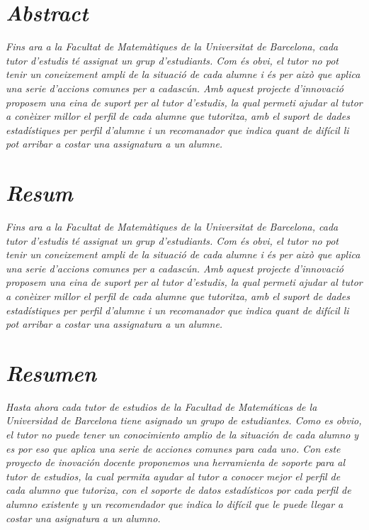 \documentclass[12pt,a4paper,catalan]{article}
\begin{document}



\section*{\textit{Abstract}}
\textit{Fins ara a la Facultat de Matemàtiques de la Universitat de Barcelona, cada tutor d'estudis té assignat un grup d'estudiants. Com és obvi, el tutor no pot tenir un coneixement ampli de la situació de cada alumne i és per això que aplica una serie d'accions comunes per a cadascún. Amb aquest projecte d'innovació proposem una eina de suport per al tutor d'estudis, la qual permeti ajudar al tutor a conèixer millor el perfil de cada alumne que tutoritza, amb el suport de dades estadístiques per perfil d'alumne i un recomanador que indica quant de difícil li pot arribar a costar una assignatura a un alumne.}

\section*{\textit{Resum}}
\textit{Fins ara a la Facultat de Matemàtiques de la Universitat de Barcelona, cada tutor d'estudis té assignat un grup d'estudiants. Com és obvi, el tutor no pot tenir un coneixement ampli de la situació de cada alumne i és per això que aplica una serie d'accions comunes per a cadascún. Amb aquest projecte d'innovació proposem una eina de suport per al tutor d'estudis, la qual permeti ajudar al tutor a conèixer millor el perfil de cada alumne que tutoritza, amb el suport de dades estadístiques per perfil d'alumne i un recomanador que indica quant de difícil li pot arribar a costar una assignatura a un alumne.}

\section*{\textit{Resumen}}
\textit{Hasta ahora cada tutor de estudios de la Facultad de Matemáticas de la Universidad de Barcelona tiene asignado un grupo de estudiantes. Como es obvio, el tutor no puede tener un conocimiento amplio de la situación de cada alumno y es por eso que aplica una serie de acciones comunes para cada uno. Con este proyecto de inovación docente proponemos una herramienta de soporte para al tutor de estudios, la cual permita ayudar al tutor a conocer mejor el perfil de cada alumno que tutoriza, con el soporte de datos estadísticos por cada perfil de alumno existente y un recomendador que indica lo difícil que le puede llegar a costar una asignatura a un alumno.}
\end{document}
